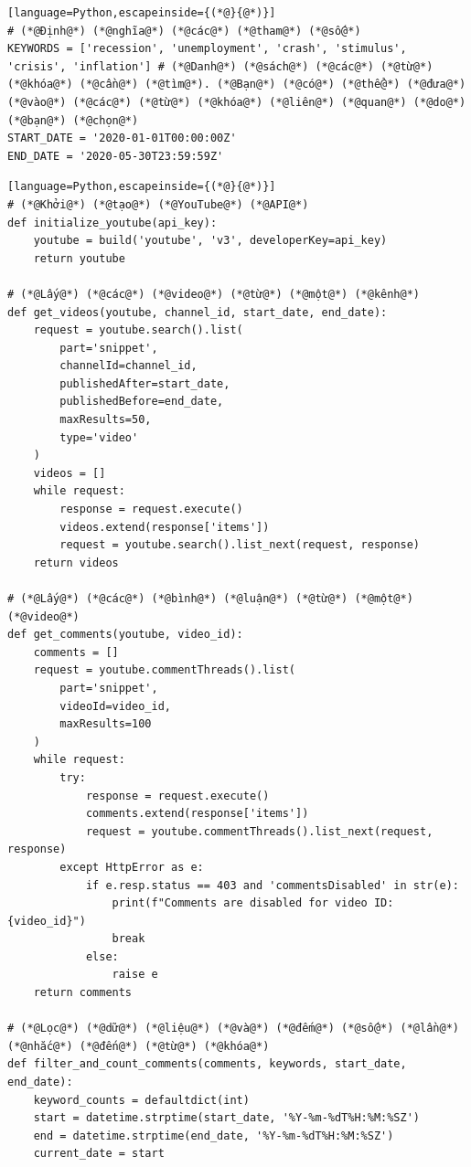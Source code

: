 \begin{lstlisting}[language=Python,escapeinside={(*@}{@*)}]
# (*@Định@*) (*@nghĩa@*) (*@các@*) (*@tham@*) (*@số@*)
KEYWORDS = ['recession', 'unemployment', 'crash', 'stimulus', 'crisis', 'inflation'] # (*@Danh@*) (*@sách@*) (*@các@*) (*@từ@*) (*@khóa@*) (*@cần@*) (*@tìm@*). (*@Bạn@*) (*@có@*) (*@thể@*) (*@đưa@*) (*@vào@*) (*@các@*) (*@từ@*) (*@khóa@*) (*@liên@*) (*@quan@*) (*@do@*) (*@bạn@*) (*@chọn@*)
START_DATE = '2020-01-01T00:00:00Z'
END_DATE = '2020-05-30T23:59:59Z'
\end{lstlisting}

\begin{lstlisting}[language=Python,escapeinside={(*@}{@*)}]
# (*@Khởi@*) (*@tạo@*) (*@YouTube@*) (*@API@*)
def initialize_youtube(api_key):
    youtube = build('youtube', 'v3', developerKey=api_key)
    return youtube

# (*@Lấy@*) (*@các@*) (*@video@*) (*@từ@*) (*@một@*) (*@kênh@*)
def get_videos(youtube, channel_id, start_date, end_date):
    request = youtube.search().list(
        part='snippet',
        channelId=channel_id,
        publishedAfter=start_date,
        publishedBefore=end_date,
        maxResults=50,
        type='video'
    )
    videos = []
    while request:
        response = request.execute()
        videos.extend(response['items'])
        request = youtube.search().list_next(request, response)
    return videos

# (*@Lấy@*) (*@các@*) (*@bình@*) (*@luận@*) (*@từ@*) (*@một@*) (*@video@*)
def get_comments(youtube, video_id):
    comments = []
    request = youtube.commentThreads().list(
        part='snippet',
        videoId=video_id,
        maxResults=100
    )
    while request:
        try:
            response = request.execute()
            comments.extend(response['items'])
            request = youtube.commentThreads().list_next(request, response)
        except HttpError as e:
            if e.resp.status == 403 and 'commentsDisabled' in str(e):
                print(f"Comments are disabled for video ID: {video_id}")
                break
            else:
                raise e
    return comments

# (*@Lọc@*) (*@dữ@*) (*@liệu@*) (*@và@*) (*@đếm@*) (*@số@*) (*@lần@*) (*@nhắc@*) (*@đến@*) (*@từ@*) (*@khóa@*)
def filter_and_count_comments(comments, keywords, start_date, end_date):
    keyword_counts = defaultdict(int)
    start = datetime.strptime(start_date, '%Y-%m-%dT%H:%M:%SZ')
    end = datetime.strptime(end_date, '%Y-%m-%dT%H:%M:%SZ')
    current_date = start


\end{lstlisting}
